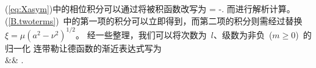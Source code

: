 (\ref{eq:Xasym})中的相位积分可以通过将被积函数改写为
\eq \label{B.twoterms}
=
{}-.
\en
而进行解析计算。
(\ref{B.twoterms})~中的第一项的积分可以立即得到，而第二项的积分则需经过替换~ $\xi=\mu(a^2-\nu^2)^{1/2}$。
经一些整理，我们可以将次数为~$l$、级数为非负~($m\geq 0$)~的归一化
连带勒让德函数的渐近表达式写为
\eqa  \label{eq:Xlmasym}  \nonumber \\
&&\mbox{}
\times\cos{}.\frac{}{}
\ena
\begin{figure}
\begin{center}
\end{center}
\end{figure}
